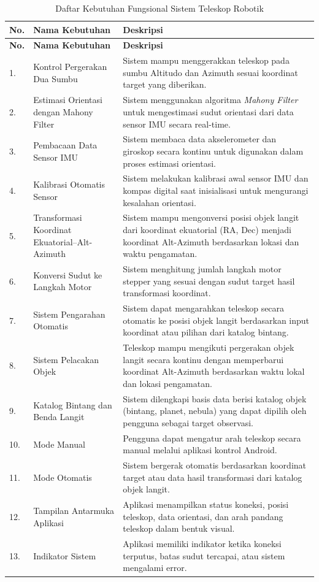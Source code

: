 \begin{longtable}{|b{}|p{}|p{}|}
	\caption{Daftar Kebutuhan Fungsional Sistem Teleskop Robotik}
	\label{table:3.kebutuhanF}\\
	\hline
	\textbf{No.} & \textbf{Nama Kebutuhan} & \textbf{Deskripsi} \\
	\hline
	\endfirsthead
	\hline
	\textbf{No.} & \textbf{Nama Kebutuhan} & \textbf{Deskripsi} \\
	\hline
	\endhead
	
	1. & Kontrol Pergerakan Dua Sumbu & Sistem mampu menggerakkan teleskop pada sumbu Altitudo dan Azimuth sesuai koordinat target yang diberikan. \\
	\hline
	2. & Estimasi Orientasi dengan Mahony Filter & Sistem menggunakan algoritma \textit{Mahony Filter} untuk mengestimasi sudut orientasi dari data sensor IMU secara real-time. \\
	\hline
	3. & Pembacaan Data Sensor IMU & Sistem membaca data akselerometer dan giroskop secara kontinu untuk digunakan dalam proses estimasi orientasi. \\
	\hline
	4. & Kalibrasi Otomatis Sensor & Sistem melakukan kalibrasi awal sensor IMU dan kompas digital saat inisialisasi untuk mengurangi kesalahan orientasi. \\
	\hline
	5. & Transformasi Koordinat Ekuatorial–Alt-Azimuth & Sistem mampu mengonversi posisi objek langit dari koordinat ekuatorial (RA, Dec) menjadi koordinat Alt-Azimuth berdasarkan lokasi dan waktu pengamatan. \\
	\hline
	6. & Konversi Sudut ke Langkah Motor & Sistem menghitung jumlah langkah motor stepper yang sesuai dengan sudut target hasil transformasi koordinat. \\
	\hline
	7. & Sistem Pengarahan Otomatis & Sistem dapat mengarahkan teleskop secara otomatis ke posisi objek langit berdasarkan input koordinat atau pilihan dari katalog bintang. \\
	\hline
	8. & Sistem Pelacakan Objek & Teleskop mampu mengikuti pergerakan objek langit secara kontinu dengan memperbarui koordinat Alt-Azimuth berdasarkan waktu lokal dan lokasi pengamatan. \\
	\hline
	9. & Katalog Bintang dan Benda Langit & Sistem dilengkapi basis data berisi katalog objek (bintang, planet, nebula) yang dapat dipilih oleh pengguna sebagai target observasi. \\
	\hline
	10. & Mode Manual & Pengguna dapat mengatur arah teleskop secara manual melalui aplikasi kontrol Android. \\
	\hline
	11. & Mode Otomatis & Sistem bergerak otomatis berdasarkan koordinat target atau data hasil transformasi dari katalog objek langit. \\
	\hline
	12. & Tampilan Antarmuka Aplikasi & Aplikasi menampilkan status koneksi, posisi teleskop, data orientasi, dan arah pandang teleskop dalam bentuk visual. \\
	\hline
	13. & Indikator Sistem & Aplikasi memiliki indikator ketika koneksi terputus, batas sudut tercapai, atau sistem mengalami error. \\
	\hline
\end{longtable}

